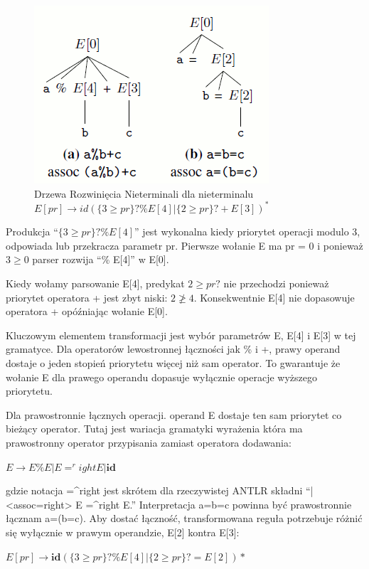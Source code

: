 \begin{figure}[h]
\includegraphics[scale=0.67]{Figure15.png}
\caption{Drzewa Rozwinięcia Nieterminali dla nieterminalu
$E[pr]\rightarrow id (\{3 \geq pr \}? \%E[4]|\{2 \geq pr \}? +E[3])^* $}
\end{figure}
\par
Produkcja “$\{ 3 \geq pr\}? \%E[4]$” jest wykonalna kiedy priorytet
operacji modulo 3, odpowiada lub przekracza parametr pr.
Pierwsze wołanie E ma pr = 0 i ponieważ $3 \geq 0$
parser rozwija “\% E[4]” w E[0].
\par
Kiedy wołamy parsowanie E[4], predykat $ {2 \geq pr}?$ nie przechodzi
ponieważ priorytet operatora + jest zbyt niski: $2 \ngeq 4$.
Konsekwentnie E[4] nie dopasowuje operatora + opóźniając
wołanie E[0].
\par
Kluczowym elementem transformacji jest wybór 
parametrów E, E[4] i E[3] w tej gramatyce. Dla operatorów lewostronnej łączności
jak \% i +, prawy operand dostaje o jeden stopień priorytetu więcej niż sam operator.
To gwarantuje że wołanie E dla prawego operandu dopasuje wyłącznie operacje wyższego priorytetu.
\par
Dla prawostronnie łącznych operacji. operand E dostaje ten sam priorytet
co bieżący operator. Tutaj jest wariacja gramatyki wyrażenia która ma prawostronny 
operator przypisania zamiast operatora dodawania:
\par
$E \rightarrow E \% E |E =^right E | \textbf{id}$
\par
gdzie notacja =^right jest skrótem dla rzeczywistej ANTLR
składni “|<assoc=right> E =^right E.” 
Interpretacja a=b=c powinna być prawostronnie łącznam a=(b=c). Aby dostać łączność,
transformowana reguła potrzebuje różnić się wyłącznie w prawym 
operandzie, E[2] kontra E[3]:
\par
$E[pr] \rightarrow \textbf{id} (\{3 \geq pr\}? \%E[4] |\{2\geq pr\}? = E[2])*$
\par
